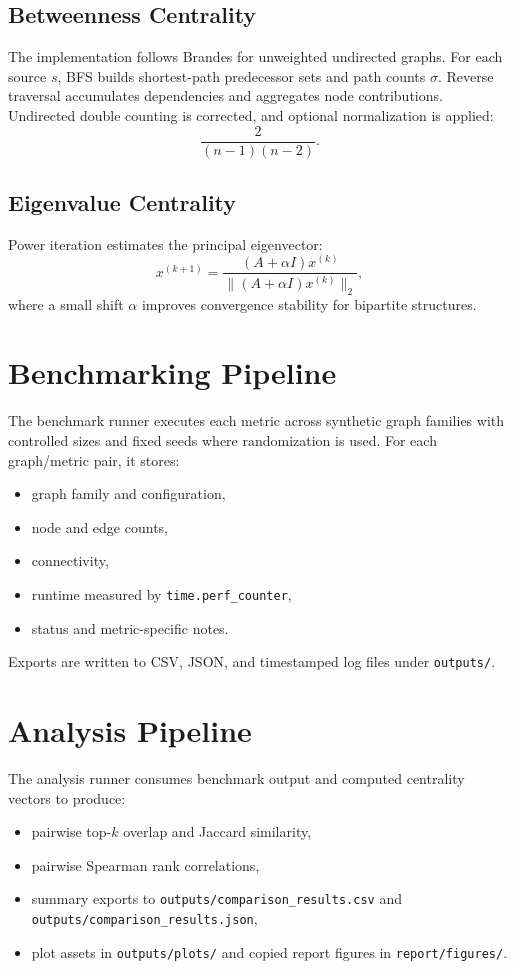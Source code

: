 \documentclass[11pt]{article}
\begin{document}
\subsection{Betweenness Centrality}
The implementation follows Brandes for unweighted undirected graphs. For each source $s$, BFS builds shortest-path predecessor sets and path counts $\sigma$. Reverse traversal accumulates dependencies and aggregates node contributions. Undirected double counting is corrected, and optional normalization is applied:
\[
\frac{2}{(n-1)(n-2)}.
\]

\subsection{Eigenvalue Centrality}
Power iteration estimates the principal eigenvector:
\[
x^{(k+1)}=\frac{(A+\alpha I)x^{(k)}}{\|(A+\alpha I)x^{(k)}\|_2},
\]
where a small shift $\alpha$ improves convergence stability for bipartite structures.

\section{Benchmarking Pipeline}
The benchmark runner executes each metric across synthetic graph families with controlled sizes and fixed seeds where randomization is used. For each graph/metric pair, it stores:
\begin{itemize}[leftmargin=*]
    \item graph family and configuration,
    \item node and edge counts,
    \item connectivity,
    \item runtime measured by \texttt{time.perf\_counter},
    \item status and metric-specific notes.
\end{itemize}
Exports are written to CSV, JSON, and timestamped log files under \texttt{outputs/}.

\section{Analysis Pipeline}
The analysis runner consumes benchmark output and computed centrality vectors to produce:
\begin{itemize}[leftmargin=*]
    \item pairwise top-$k$ overlap and Jaccard similarity,
    \item pairwise Spearman rank correlations,
    \item summary exports to \texttt{outputs/comparison\_results.csv} and \texttt{outputs/comparison\_results.json},
    \item plot assets in \texttt{outputs/plots/} and copied report figures in \texttt{report/figures/}.
\end{itemize}
\end{document}
